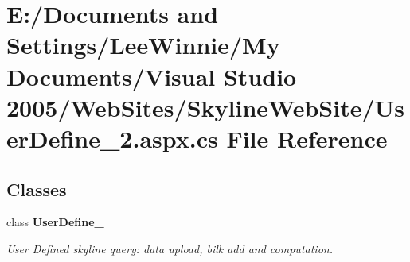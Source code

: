 \section{E:/Documents and Settings/Lee\-Winnie/My Documents/Visual Studio 2005/Web\-Sites/Skyline\-Web\-Site/User\-Define\_\-2.aspx.cs File Reference}
\label{_user_define__2_8aspx_8cs}
\subsection*{Classes}
\begin{CompactItemize}
\item 
class {\bf User\-Define\_}
\begin{CompactList}\small\item\em User Defined skyline query: data upload, bilk add and computation. \item\end{CompactList}\end{CompactItemize}
